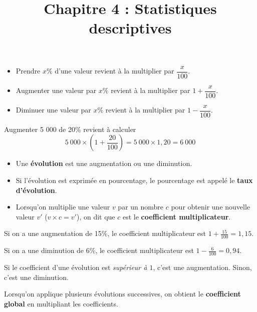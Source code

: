 \documentclass[
	classe=$2^{de}$
]{coursclass}
\title{Chapitre 4 : Statistiques descriptives}
\author{}
\date{}
\begin{document}
\maketitle

\begin{definition}[pourcentage]
	\begin{itemize}
		\item Prendre $x\%$ d'une valeur revient à la multiplier par $\dfrac{x}{100}$.
		\item Augmenter une valeur par $x\%$ revient à la multiplier par $1 + \dfrac{x}{100}$.
		\item Diminuer une valeur par $x\%$ revient à la multiplier par $1 - \dfrac{x}{100}$.
	\end{itemize}
\end{definition}

\begin{exemple}
	Augmenter 5 000 de 20\% revient à calculer
	$$ 5\ 000 × \left(1 + \frac{20}{100}\right) = 5\ 000 × 1,20 = 6\ 000 $$
\end{exemple}

\begin{definition}[vocabulaire]
	\begin{itemize}
		\item Une \textbf{évolution} est une augmentation ou une diminution.
		\item Si l'évolution est exprimée en pourcentage, le pourcentage est appelé le \textbf{taux d'évolution}.
		\item Lorsqu'on multiplie une valeur $v$ par un nombre $c$ pour obtenir une nouvelle valeur $v'$ ($v × c = v'$), on dit que $c$ est le \textbf{coefficient multiplicateur}.
	\end{itemize}
\end{definition}

\begin{exemple}
	Si on a une augmentation de 15\%, le coefficient multiplicateur est $1 + \frac{15}{100} = 1,15$.

	Si on a une diminution de 6\%, le coefficient multiplicateur est $1 - \frac{6}{100} = 0,94$.
\end{exemple}

\begin{greybox}[frametitle={Remarque}]
	Si le coefficient d'une évolution est \textit{supérieur à $1$}, c'est une augmentation. Sinon, c'est une diminution.
\end{greybox}

\begin{propriete}
	Lorsqu'on applique plusieurs évolutions successives, on obtient le \textbf{coefficient global} en multipliant les coefficients.
\end{propriete}
\end{document}
